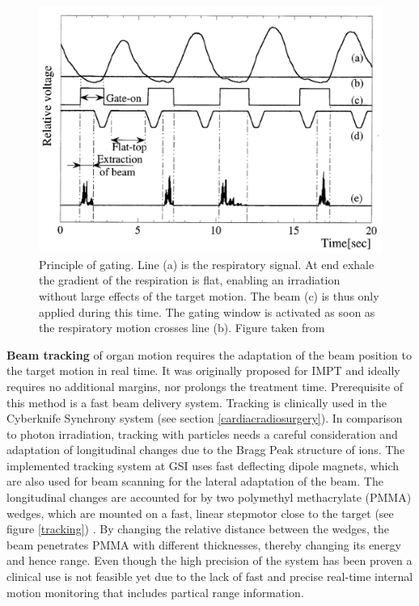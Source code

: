 \begin{figure}[H]
\begin{center}
\includegraphics[scale=0.45]{./teile/introduction/gating.png}
\caption{Principle of gating. Line (a) is the respiratory signal. At end exhale the gradient of the respiration is flat, enabling an 
irradiation without large effects of the target motion. The beam (c) is thus only applied during this time. The gating window is activated 
as soon as the respiratory motion crosses line (b). Figure taken from \cite{Min00}}
\label{gating}
\end{center}
\end{figure}


\textbf{Beam tracking} of organ motion requires the adaptation of the beam position to the target motion in real time. It was originally proposed 
for IMPT \cite{Kea01} and ideally requires no additional margins, nor prolongs the treatment time. Prerequisite of this method is a fast beam 
delivery system. Tracking is clinically used in the Cyberknife Synchrony system (see section \ref{cardiacradiosurgery}). 
In comparison to photon irradiation, tracking with particles needs a careful consideration and adaptation of longitudinal changes due to 
the Bragg Peak structure of ions. The implemented tracking system at GSI \cite{Gro04} uses fast deflecting dipole magnets, which 
are also used for beam scanning for the lateral adaptation of the beam. The longitudinal changes are accounted for by two polymethyl 
methacrylate (PMMA) wedges, which are mounted on a fast, linear stepmotor close to the target (see figure \ref{tracking}) \cite{Sai09}. By 
changing the relative distance between the wedges, the beam penetrates PMMA with different thicknesses, thereby changing its energy and 
hence range. Even though the high precision of the system has been proven \cite{Ber07, Ber10, Sai09} a clinical use 
is not feasible yet due to the lack of fast and precise real-time internal motion monitoring that includes partical range information.

